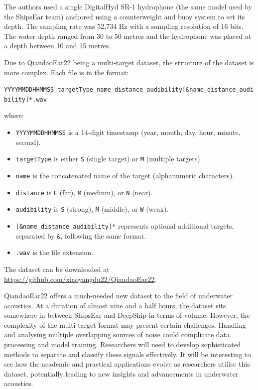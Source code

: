 The authors used a single DigitalHyd SR-1 hydrophone (the same model used by the ShipsEar team) anchored using a counterweight and buoy system to set its depth. The sampling rate was 52,734 Hz with a sampling resolution of 16 bits. The water depth ranged from 30 to 50 metres and the hydrophone was placed at a depth between 10 and 15 metres. 

Due to QiandaoEar22 being a multi-target dataset, the structure of the dataset is more complex. Each file is in the format:

{\small\centerline{\texttt{YYYYMMDDHHMMSS\_targetType\_name\_distance\_audibility[\&name\_distance\_audibility]*.wav}}}

where:
\begin{itemize}
    \item \texttt{YYYYMMDDHHMMSS} is a 14-digit timestamp (year, month, day, hour, minute, second).
    \item \texttt{targetType} is either \texttt{S} (single target) or \texttt{M} (multiple targets).
    \item \texttt{name} is the concatenated name of the target (alphanumeric characters).
    \item \texttt{distance} is \texttt{F} (far), \texttt{M} (medium), or \texttt{N} (near).
    \item \texttt{audibility} is \texttt{S} (strong), \texttt{M} (middle), or \texttt{W} (weak).
    \item \texttt{[\&name\_distance\_audibility]*} represents optional additional targets, separated by \texttt{\&}, following the same format.
    \item \texttt{.wav} is the file extension.
\end{itemize}

The dataset can be downloaded at \url{https://github.com/xiaoyangdu22/QiandaoEar22}.

QiandaoEar22 offers a much-needed new dataset to the field of underwater acoustics. At a duration of almost nine and a half hours, the dataset sits somewhere in-between ShipsEar and DeepShip in terms of volume. However, the complexity of the multi-target format may present certain challenges. Handling and analysing multiple overlapping sources of noise could complicate data processing and model training. Researchers will need to develop sophisticated methods to separate and classify these signals effectively. It will be interesting to see how the academic and practical applications evolve as researchers utilise this dataset, potentially leading to new insights and advancements in underwater acoustics.

